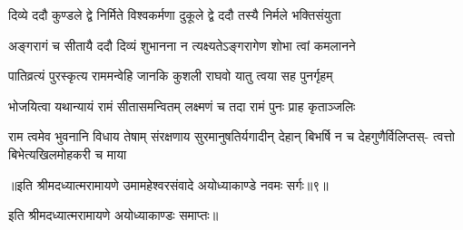 \twolineshloka
{दिव्ये ददौ कुण्डले द्वे निर्मिते विश्वकर्मणा}
{दुकूले द्वे ददौ तस्यै निर्मले भक्तिसंयुता} %

\twolineshloka
{अङ्गरागं च सीतायै ददौ दिव्यं शुभानना}
{न त्यक्ष्यतेऽङ्गरागेण शोभा त्वां कमलानने} %

\twolineshloka
{पातिव्रत्यं पुरस्कृत्य राममन्वेहि जानकि}
{कुशली राघवो यातु त्वया सह पुनर्गृहम्} %

\twolineshloka
{भोजयित्वा यथान्यायं रामं सीतासमन्वितम्}
{लक्ष्मणं च तदा रामं पुनः प्राह कृताञ्जलिः} %

\fourlineindentedshloka
{राम त्वमेव भुवनानि विधाय तेषाम्}
{संरक्षणाय सुरमानुषतिर्यगादीन्}
{देहान् बिभर्षि न च देहगुणैर्विलिप्तस्-}
{त्वत्तो बिभेत्यखिलमोहकरी च माया} %

{॥इति श्रीमदध्यात्मरामायणे उमामहेश्वरसंवादे
अयोध्याकाण्डे नवमः सर्गः॥९॥
}

इति श्रीमदध्यात्मरामायणे अयोध्याकाण्डः समाप्तः॥